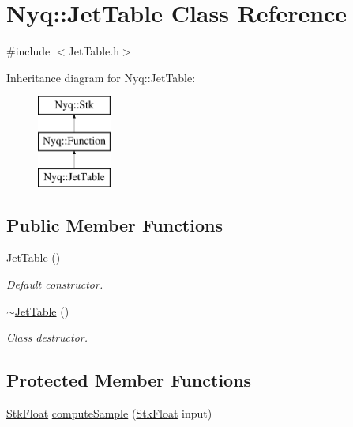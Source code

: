 \hypertarget{class_nyq_1_1_jet_table}{}\section{Nyq\+:\+:Jet\+Table Class Reference}
\label{class_nyq_1_1_jet_table}


{\ttfamily \#include $<$Jet\+Table.\+h$>$}

Inheritance diagram for Nyq\+:\+:Jet\+Table\+:\begin{figure}[H]
\begin{center}
\leavevmode
\includegraphics[height=3.000000cm]{class_nyq_1_1_jet_table}
\end{center}
\end{figure}
\subsection*{Public Member Functions}
\begin{DoxyCompactItemize}
\item 
\hyperlink{class_nyq_1_1_jet_table_a50e9b828ada973119cd7263bc14d3220}{Jet\+Table} ()
\begin{DoxyCompactList}\small\item\em Default constructor. \end{DoxyCompactList}\item 
\hyperlink{class_nyq_1_1_jet_table_ad5317ef00b31dda0ff337cc4cbf83ecb}{$\sim$\+Jet\+Table} ()
\begin{DoxyCompactList}\small\item\em Class destructor. \end{DoxyCompactList}\end{DoxyCompactItemize}
\subsection*{Protected Member Functions}
\begin{DoxyCompactItemize}
\item 
\hyperlink{namespace_nyq_a044fa20a706520a617bbbf458a7db7e4}{Stk\+Float} \hyperlink{class_nyq_1_1_jet_table_a9968670ec568f34b0e807ec3748324af}{compute\+Sample} (\hyperlink{namespace_nyq_a044fa20a706520a617bbbf458a7db7e4}{Stk\+Float} input)
\end{DoxyCompactItemize}
